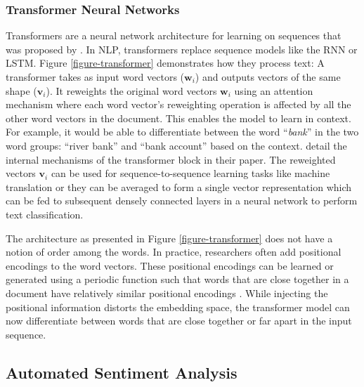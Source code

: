 \subsubsection{Transformer Neural Networks}
Transformers are a neural network architecture for learning on sequences that was proposed by . In NLP, transformers replace sequence models like the RNN or LSTM. Figure \ref{figure-transformer} demonstrates how they process text: A transformer takes as input word vectors ($\bm{w}_i$) and outputs vectors of the same shape ($\bm{v}_i$). It reweights the original word vectors $\bm{w}_i$ using an attention mechanism where each word vector's reweighting operation is affected by all the other word vectors in the document. This enables the model to learn in context. For example, it would be able to differentiate between the word ``\emph{bank}'' in the two word groups: ``river bank'' and ``bank account'' based on the context.  detail the internal mechanisms of the transformer block in their paper. The reweighted vectors $\bm{v}_i$ can be used for sequence-to-sequence learning tasks like machine translation or they can be averaged to form a single vector representation which can be fed to subsequent densely connected layers in a neural network to perform text classification.




The architecture as presented in Figure \ref{figure-transformer} does not have a notion of order among the words. In practice, researchers often add positional encodings to the word vectors. These positional encodings can be learned or generated using a periodic function such that words that are close together in a document have relatively similar positional encodings \cite{vaswani2017attention}. While injecting the positional information distorts the embedding space, the transformer model can now differentiate between words that are close together or far apart in the input sequence.


\subsection{Automated Sentiment Analysis}
\label{section-automated-sa}
